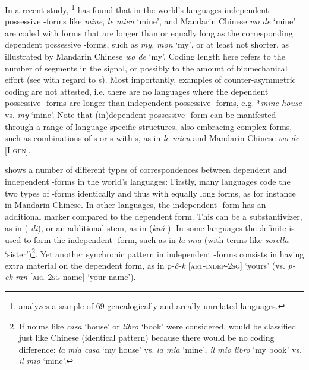 \documentclass[output=paper]{langsci/langscibook}
\begin{document}
In a recent study, \citet{Ye2017}{\-}\footnote{\citet{Ye2017} analyzes a sample of 69 genealogically and areally unrelated languages.} has found that in the world's languages independent possessive -forms like  \textit{mine},  \textit{le mien} ‘mine’, and Mandarin  Chinese \textit{wo de} ‘mine’ are coded with forms that are longer than or equally long as the corresponding dependent possessive -forms, such as  \textit{my,}  \textit{mon} ‘my’, or at least not shorter, as illustrated by Mandarin  Chinese \textit{wo de} ‘my’. Coding length here refers to the number of segments in the signal, or possibly to the amount of biomechanical effort (see \citealt{NapoliEtAl2014} with regard to s). Most importantly, examples of counter-asymmetric coding are not attested, i.e. there are no languages where the dependent possessive -forms are longer than independent possessive -forms, e.g. *\textit{mine house} vs. \textit{my} ‘mine’. Note that (in)dependent possessive -form can be manifested through a range of language-specific structures, also embracing complex forms, such as combinations of s or s with s, as in  \textit{le mien} and Mandarin  Chinese \textit{wo de} [I \textsc{gen}]. 

\largerpage
{} shows a number of different types of correspondences between dependent and independent -forms in the world's languages: Firstly, many languages code the two types of -forms identically and thus with equally long forms, as for instance in Mandarin  Chinese. In other languages, the independent -form has an additional marker compared to the dependent form. This can be a substantivizer, as in  (\textit{{}-di}), or an additional stem, as in  (\textit{kaá}{}-). In some languages the definite  is used to form the independent -form, such as in  \textit{la mia} (with  terms like \textit{sorella} ‘sister’)\footnote{If nouns like \textit{casa} ‘house’ or \textit{libro} ‘book’ were considered,  would be classified just like Chinese  (identical pattern) because there would be no coding difference: \textit{la mia casa} ‘my house’ vs. \textit{la mia} ‘mine’, \textit{il mio libro} ‘my book’ vs. \textit{il mio} ‘mine’.}. Yet another synchronic pattern in independent -forms consists in having extra material on the dependent form, as in  \textit{p-ô-k} [\textsc{art-indep-2sg}] ‘yours’ (vs. \textit{p-ek-ran} [\textsc{art-2sg}{}-name] ‘your name’).
\end{document}

